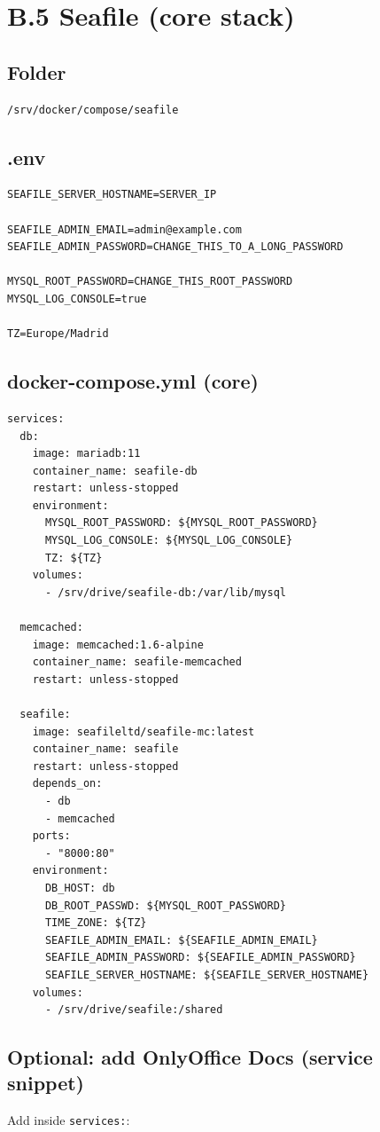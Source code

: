 \section{B.5 Seafile (core stack)}
\subsection*{Folder}
\begin{lstlisting}
/srv/docker/compose/seafile
\end{lstlisting}

\subsection*{.env}
\begin{lstlisting}
SEAFILE_SERVER_HOSTNAME=SERVER_IP

SEAFILE_ADMIN_EMAIL=admin@example.com
SEAFILE_ADMIN_PASSWORD=CHANGE_THIS_TO_A_LONG_PASSWORD

MYSQL_ROOT_PASSWORD=CHANGE_THIS_ROOT_PASSWORD
MYSQL_LOG_CONSOLE=true

TZ=Europe/Madrid
\end{lstlisting}

\subsection*{docker-compose.yml (core)}
\begin{lstlisting}
services:
  db:
    image: mariadb:11
    container_name: seafile-db
    restart: unless-stopped
    environment:
      MYSQL_ROOT_PASSWORD: ${MYSQL_ROOT_PASSWORD}
      MYSQL_LOG_CONSOLE: ${MYSQL_LOG_CONSOLE}
      TZ: ${TZ}
    volumes:
      - /srv/drive/seafile-db:/var/lib/mysql

  memcached:
    image: memcached:1.6-alpine
    container_name: seafile-memcached
    restart: unless-stopped

  seafile:
    image: seafileltd/seafile-mc:latest
    container_name: seafile
    restart: unless-stopped
    depends_on:
      - db
      - memcached
    ports:
      - "8000:80"
    environment:
      DB_HOST: db
      DB_ROOT_PASSWD: ${MYSQL_ROOT_PASSWORD}
      TIME_ZONE: ${TZ}
      SEAFILE_ADMIN_EMAIL: ${SEAFILE_ADMIN_EMAIL}
      SEAFILE_ADMIN_PASSWORD: ${SEAFILE_ADMIN_PASSWORD}
      SEAFILE_SERVER_HOSTNAME: ${SEAFILE_SERVER_HOSTNAME}
    volumes:
      - /srv/drive/seafile:/shared
\end{lstlisting}

\subsection*{Optional: add OnlyOffice Docs (service snippet)}
Add inside \texttt{services:}:

